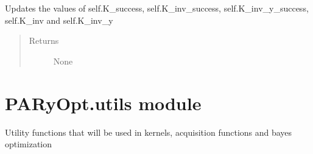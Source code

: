 \documentclass[letterpaper,12pt,english]{sphinxmanual}
\begin{document}
\begin{fulllineitems}
\begin{fulllineitems}
\begin{enumerate}
\begin{enumerate}
\end{enumerate}

\end{enumerate}

\sphinxAtStartPar
Updates the values of self.K\_success, self.K\_inv\_success, self.K\_inv\_y\_success, self.K\_inv and self.K\_inv\_y
\begin{quote}\begin{description}
\item[{Returns}] \leavevmode
\sphinxAtStartPar
None

\end{description}\end{quote}

\end{fulllineitems}


\end{fulllineitems}



\section{PARyOpt.utils module}
\label{\detokenize{PARyOpt:module-PARyOpt.utils}}\label{\detokenize{PARyOpt:paryopt-utils-module}}
\sphinxAtStartPar
Utility functions that will be used in kernels, acquisition functions
and bayes optimization
\end{document}
